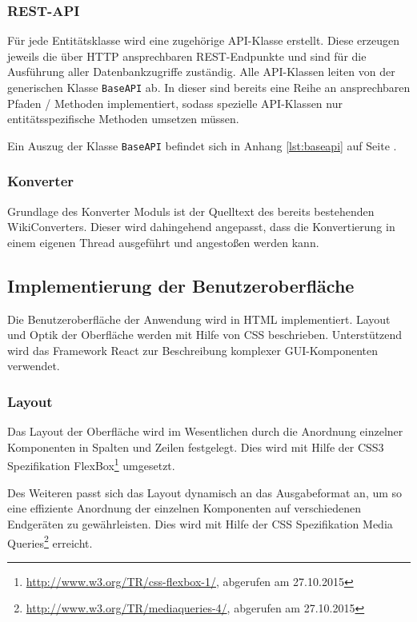 \documentclass[12pt, xcolor=dvipsnames]{scrartcl}
\begin{document}
\subsubsection*{REST-API}

Für jede Entitätsklasse wird eine zugehörige API-Klasse erstellt. Diese erzeugen jeweils die über HTTP ansprechbaren REST-Endpunkte und sind für die Ausführung aller Datenbankzugriffe zuständig. Alle API-Klassen leiten von der generischen Klasse \texttt{BaseAPI} ab. In dieser sind bereits eine Reihe an ansprechbaren Pfaden / Methoden implementiert, sodass spezielle API-Klassen nur entitätsspezifische Methoden umsetzen müssen.

Ein Auszug der Klasse \texttt{BaseAPI} befindet sich in Anhang \ref{lst:baseapi} auf Seite \pageref{lst:baseapi}.

\subsubsection*{Konverter}

Grundlage des Konverter Moduls ist der Quelltext des bereits bestehenden WikiConverters. Dieser wird dahingehend angepasst, dass die Konvertierung in einem eigenen Thread ausgeführt und angestoßen werden kann.

\subsection{Implementierung der Benutzeroberfläche}

Die Benutzeroberfläche der Anwendung wird in HTML implementiert.
Layout und Optik der Oberfläche werden mit Hilfe von CSS beschrieben. 
Unterstützend wird das Framework React zur Beschreibung komplexer GUI-Komponenten verwendet.

\subsubsection*{Layout}

Das Layout der Oberfläche wird im Wesentlichen durch die Anordnung einzelner Komponenten in Spalten und Zeilen festgelegt.
Dies wird mit Hilfe der CSS3 Spezifikation
FlexBox\footnote{\url{http://www.w3.org/TR/css-flexbox-1/}, abgerufen am 27.10.2015} umgesetzt.

Des Weiteren passt sich das Layout dynamisch an das Ausgabeformat an, um so eine effiziente Anordnung der einzelnen Komponenten auf verschiedenen Endgeräten zu gewährleisten. Dies wird mit Hilfe der CSS Spezifikation
Media Queries\footnote{\url{http://www.w3.org/TR/mediaqueries-4/}, abgerufen am 27.10.2015} erreicht.
\end{document}
